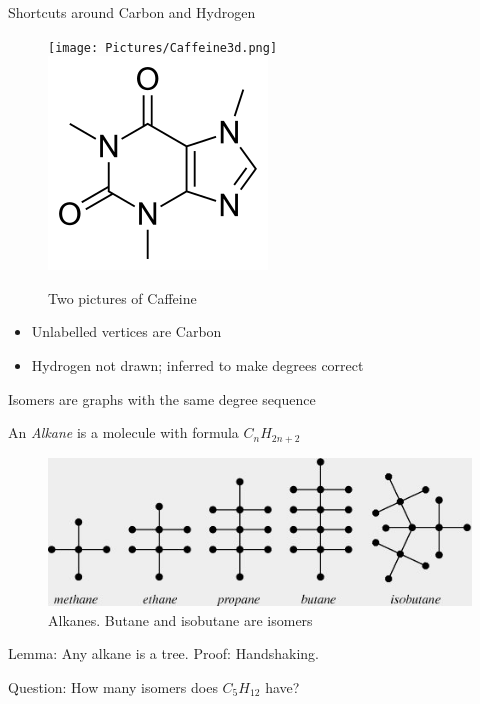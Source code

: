\documentclass{beamer}
\begin{document}
\begin{frame}{Shortcuts around Carbon and Hydrogen}
  \begin{figure}
    \texttt{[image: Pictures/Caffeine3d.png]}
    \includegraphics[width=.5\textwidth]{Pictures/Caffeine_structure.png}
    \caption{Two pictures of Caffeine}
  \end{figure}
  \begin{itemize}
  \item Unlabelled vertices are Carbon
  \item Hydrogen not drawn; inferred to make degrees correct
  \end{itemize}
\end{frame}

\begin{frame}{Isomers are graphs with the same degree sequence}
  \begin{definition}An \emph{Alkane} is a molecule with formula $C_nH_{2n+2}$
  \end{definition}
\begin{figure}
  \includegraphics[width=.8\textwidth]{Pictures/Hydrocarbons.jpg}
  \caption{Alkanes.  Butane and isobutane are isomers}
  \end{figure}

  
\begin{block}{Lemma: Any alkane is a tree.}
  Proof: Handshaking.
  \end{block}
\begin{block}{Question: How many isomers does $C_5H_{12}$ have?}
\end{block}
\end{frame}
\end{document}
